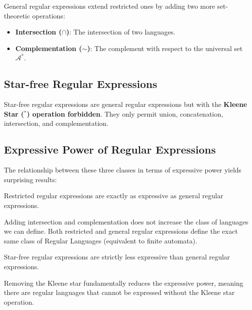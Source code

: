 General regular expressions extend restricted ones by adding two more set-theoretic operations:
\begin{itemize}
\item \textbf{Intersection ($\cap$)}: The intersection of two languages.
\item \textbf{Complementation ($\sim$)}: The complement with respect to the universal set $\mathcal{A}^*$.
\end{itemize}

\subsection{Star-free Regular Expressions}

Star-free regular expressions are general regular expressions but with the \textbf{Kleene Star ($^*$) operation forbidden}. They only permit union, concatenation, intersection, and complementation.

\subsection{Expressive Power of Regular Expressions}

The relationship between these three classes in terms of expressive power yields surprising results:

\begin{theorem}
Restricted regular expressions are exactly as expressive as general regular expressions. 
\end{theorem}
Adding intersection and complementation does not increase the class of languages we can define. Both restricted and general regular expressions define the exact same class of Regular Languages (equivalent to finite automata).

\begin{theorem}
Star-free regular expressions are strictly less expressive than general regular expressions.
\end{theorem}
Removing the Kleene star fundamentally reduces the expressive power, meaning there are regular languages that cannot be expressed without the Kleene star operation.
